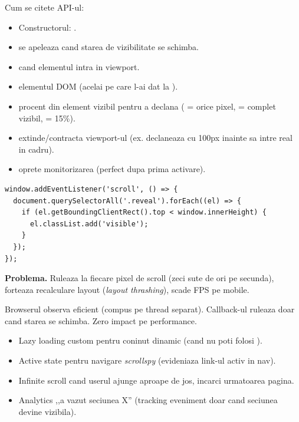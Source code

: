 Cum se citete API-ul:
\begin{itemize}[itemsep=1pt]
  \item Constructorul: .
  \item {} \textendash{} se ape\-leaza cand starea de vizibilitate se schimba.
  \item {} \textendash{}  cand elementul intra in viewport.
  \item {} \textendash{} elementul DOM (acelai pe care l-ai dat la ).
  \item {} \textendash{} procent din element vizibil pentru a declana ( = orice pixel,  = complet vizibil,  = 15\%).
  \item {} \textendash{} extinde/contracta viewport-ul (ex.  declaneaza cu 100px inainte sa intre real in cadru).
  \item {} \textendash{} oprete monitorizarea (perfect dupa prima activare).
\end{itemize}

\begin{dano}
\begin{lstlisting}[style=js, numbers=none]
window.addEventListener('scroll', () => {
  document.querySelectorAll('.reveal').forEach((el) => {
    if (el.getBoundingClientRect().top < window.innerHeight) {
      el.classList.add('visible');
    }
  });
});
\end{lstlisting}
\textbf{Problema.} Ruleaza la fiecare pixel de scroll (zeci \textendash{} sute de ori pe secunda), forteaza recalculare layout (\emph{layout thrashing}), scade FPS pe mobile.
\end{dano}

\begin{dado}
Browserul observa eficient (compus pe thread separat). Callback-ul ruleaza doar cand starea se schimba. Zero impact pe performance.
\end{dado}

\begin{ponturi}
\begin{itemize}[itemsep=1pt]
  \item Lazy loading custom pentru coninut dinamic (cand nu poti folosi ).
  \item Active state pentru navigare \emph{scrollspy} (evideniaza link-ul activ in nav).
  \item Infinite scroll \textendash{} cand userul ajunge aproape de jos, incarci urmatoarea pagina.
  \item Analytics ,,a vazut seciunea X'' (tracking eveniment doar cand seciunea devine vizibila).
\end{itemize}
\end{ponturi}

